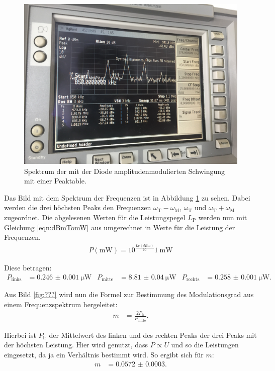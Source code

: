 \begin{figure}[H]
  \centering
  \includegraphics[width=\textwidth]{Spektrum_Pics/c.jpg}
  \caption{Spektrum der mit der Diode amplitudenmodulierten Schwingung mit einer Peaktable.}
  \label{fig:c}
\end{figure}

Das Bild mit dem Spektrum der Frequenzen ist in Abbildung \ref{fig:c} zu sehen.
Dabei werden die drei höchsten Peaks den Frequenzen $\omega_\text{T} - \omega_\text{M}$, $\omega_\text{T}$ und $\omega_\text{T} + \omega_\text{M}$ zugeordnet.
Die abgelesenen Werten für die Leistungspegel $L_\text{P}$ werden nun mit Gleichung \eqref{eqn:dBmTomW} aus \cite{leistungspegel} umgerechnet in Werte für die Leistung der Frequenzen.
\begin{align}
  P(\si{\milli\watt}) =
   10^{\frac{L_\text{P}(\si{dBm})}{10}} \SI{1}{\milli\watt} \label{eqn:dBmTomW}
\end{align}

Diese betragen:
\begin{align*}
  P_\text{links} &= \SI{0.246(1)}{\micro\watt} & P_\text{mitte} &= \SI{8.81(4)}{\micro\watt} & P_\text{rechts} &= \SI{0.258(1)}{\micro\watt}.
\end{align*}

Aus Bild \ref{fig:???} wird nun die Formel zur Bestimmung des Modulationsgrad aus einem Frequenzspektrum hergeleitet:
\begin{align*}
  m &= \frac{2 P_\text{lr}}{P_\text{mitte}}.
\end{align*}

Hierbei ist $P_\text{lr}$ der Mittelwert des linken und des rechten Peaks der drei Peaks mit der höchsten Leistung. Hier wird genutzt, dass $P \propto U$ und so die Leistungen eingesetzt, da ja ein Verhältnis bestimmt wird.
So ergibt sich für $m$:
\begin{align*}
  m &= \num{0.0572(3)}.
\end{align*}

